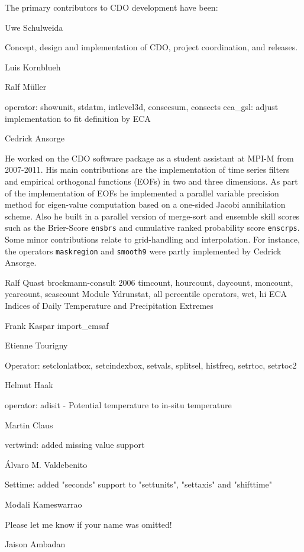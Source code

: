 The primary contributors to CDO development have been: 

Uwe Schulweida

Concept, design and implementation of CDO, project coordination, and releases.

Luis Kornblueh

Ralf Müller

operator: showunit, stdatm, intlevel3d, consecsum, consects
eca_gsl: adjust implementation to fit definition by ECA

Cedrick Ansorge

He worked on the CDO software package as a student assistant at MPI-M from 2007-2011.
His main contributions are the implementation of {time series filters} and {empirical orthogonal functions (EOFs)} in two and three dimensions. 
As part of the implementation of EOFs he implemented a parallel variable precision method for eigen-value computation based on a one-sided 
Jacobi annihilation scheme. 
Also he built in a parallel version of merge-sort and ensemble skill scores such as the {Brier-Score} \texttt{ensbrs} and
{cumulative ranked probability score} \texttt{enscrps}.
Some minor contributions relate to grid-handling and interpolation. For instance, the operators \texttt{maskregion} and \texttt{smooth9} 
were partly implemented by Cedrick Ansorge.

Ralf Quast brockmann-consult 2006
timcount, hourcount, daycount, moncount, yearcount, seascount
Module Ydrunstat, all percentile operators, 
wct, hi
ECA Indices of Daily Temperature and Precipitation Extremes

Frank Kaspar
import_cmsaf

Etienne Tourigny

Operator: setclonlatbox, setcindexbox, setvals, splitsel, histfreq, setrtoc, setrtoc2

Helmut Haak

operator: adisit - Potential temperature to in-situ temperature

Martin Claus

vertwind: added missing value support

Álvaro M. Valdebenito

Settime: added "seconds" support to "settunits", "settaxis" and "shifttime"

Modali Kameswarrao


Please let me know if your name was omitted!


Jaison Ambadan
